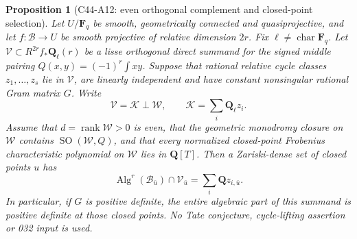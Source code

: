\documentclass[11pt]{article}
\newtheorem{proposition}[theorem]{Proposition}
\theoremstyle{remark}\newtheorem{remark}[theorem]{Remark}
\DeclareMathOperator{\Alg}{Alg}
\begin{document}
\begin{proposition}[C44-A12: even orthogonal complement and closed-point selection]
Let \(U/\mathbf F_q\) be smooth, geometrically connected and
quasiprojective, and let \(f:\mathcal B\to U\) be smooth projective
of relative dimension \(2r\). Fix \(\ell\ne\operatorname{char}\mathbf F_q\).
Let \(\mathcal V\subset R^{2r}f_*\mathbf Q_\ell(r)\) be a lisse
orthogonal direct summand for the signed middle pairing
\(Q(x,y)=(-1)^r\int xy\).
Suppose that rational relative cycle classes
\(z_1,\ldots,z_s\) lie in \(\mathcal V\), are linearly independent
and have constant nonsingular rational Gram matrix \(G\).
Write
\[
 \mathcal V=\mathcal K\perp\mathcal W,\qquad
 \mathcal K=\sum_i\mathbf Q_\ell z_i .
\]
Assume that \(d=\operatorname{rank}\mathcal W>0\) is even, that the
geometric monodromy closure on \(\mathcal W\) contains
\(\operatorname{SO}(\mathcal W,Q)\), and that every normalized
closed-point Frobenius characteristic polynomial on \(\mathcal W\)
lies in \(\mathbf Q[T]\).
Then a Zariski-dense set of closed points \(u\) has
\[
 \Alg^r(\mathcal B_{\bar u})\cap\mathcal V_{\bar u}
       =\sum_i\mathbf Q z_{i,\bar u}.                    \tag{A12.1}
\]
In particular, if \(G\) is positive definite, the entire algebraic
part of this summand is positive definite at those closed points.
No Tate conjecture, cycle-lifting assertion or 032 input is used.
\end{proposition}
\end{document}
